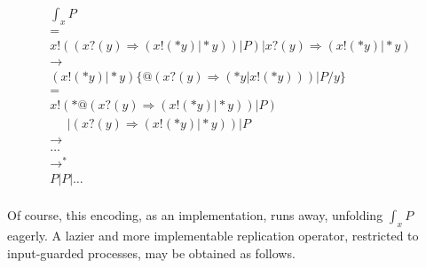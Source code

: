\documentclass[]{acm_proc_article-sp}
\makeatletter
\newcommand{\id}[1]{\texttt{#1}}
\newcommand{\juxtap}{\mathbin{\id{|}}}
\newcommand{\concat}{\Rightarrow}
\newcommand{\outputp}[2]{#1 ! ( * #2 )}
\newcommand{\prefix}[3]{#1 ? ( #2 ) \concat #3}
\newcommand{\lift}[2]{#1 ! ( #2 )}
\newcommand{\quotep}[1]{@#1}
\newcommand{\dropn}[1]{*#1}
\newcommand{\xbangp}[2]{\int_{#2} #1}
\newcommand{\substn}[2]{\id{\{} #1 / #2 \id{\}}}
\newcommand{\red}{\rightarrow}
\numberwithin{equation}{subsection}
\makeatother
\begin{document}
\begin{equation*}
  \begin{aligned}
    & \xbangp{P}{x} \\
    & = \\
    & \lift{x}{(\prefix{x}{y}{(\outputp{x}{y} \juxtap \dropn{y})) \juxtap P}} 
    \juxtap \prefix{x}{y}{(\outputp{x}{y} \juxtap \dropn{y})} \\
    & \red  \\
    & (\outputp{x}{y} \juxtap \dropn{y})\substn{\quotep{(\prefix{x}{y}{(\dropn{y} \juxtap \outputp{x}{y})) \juxtap P}}}{y} \\
    & = \\
    & \outputp{x}{\quotep{(\prefix{x}{y}{(\outputp{x}{y} \juxtap \dropn{y})) \juxtap P}}} \\
    & \;\;\;\;\;\juxtap {(\prefix{x}{y}{(\outputp{x}{y} \juxtap \dropn{y})) \juxtap P}} \\
    & \red \\
    & \ldots \\
    & \red^* \\
    & P \juxtap P \juxtap \ldots & \\
  \end{aligned}
\end{equation*}

Of course, this encoding, as an implementation, runs away, unfolding
$\xbangp{P}{x}$ eagerly. A lazier and more implementable replication
operator, restricted to input-guarded processes, may be obtained as follows.
\end{document}
